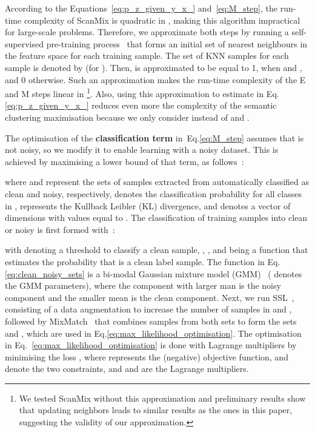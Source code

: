 \documentclass[review]{elsarticle}
\theoremstyle{plain}
\begin{document}
According to the Equations~\ref{eq:p_z_given_y_x_} and~\ref{eq:M_step}, the run-time complexity of ScanMix is quadratic in , making this algorithm impractical for large-scale problems.  Therefore, we approximate both steps by running a self-supervised pre-training process~\citep{SimCLR,MoCo,MoCoV2,SCAN} that forms an initial set of  nearest neighbours in the feature space  for each training sample.  
The set of KNN samples for each sample  is denoted by  (for ).
Then,  is approximated to be equal to 1, when  and , and 0 otherwise. Such an approximation makes the run-time complexity of the E and M steps linear in \footnote{We tested ScanMix without this approximation and preliminary results show that updating neighbors  leads to similar results as the ones in this paper, suggesting the validity of our approximation.}. Also, using this approximation to estimate  in Eq.\ref{eq:p_z_given_y_x_} reduces even more the complexity of the semantic clustering maximisation because we
only consider  instead of  and .





The optimisation of the \textbf{classification term} in~Eq.\ref{eq:M_step} assumes that  is not noisy, so we modify it to enable learning with a noisy dataset.  This is achieved by maximising a lower bound of that term, as follows~\citep{li2020dividemix}:

where  and  represent the
sets of samples extracted from  automatically classified as clean and noisy, respectively,  denotes the classification probability for all classes in ,  represents the Kullback Leibler (KL) divergence, and  denotes a vector of  dimensions with values equal to .  
The classification of training samples into clean or noisy is first formed with~\citep{arazo2019unsupervised, li2020dividemix,rog, jiang2020beyond}:
 
with  denoting a threshold to classify a clean sample, ,
, and  being a function that estimates the probability that  is a clean label sample.  The function  in Eq.\ref{eq:clean_noisy_sets} is a bi-modal Gaussian mixture model (GMM)~\citep{li2020dividemix} ( denotes the GMM parameters), where the component with larger man is the noisy component and the smaller mean is the clean component.
Next, we run SSL~\citep{li2020dividemix}, consisting of a data augmentation to increase the number of samples in  and , followed by 
MixMatch~\citep{MixMatch} 
that combines samples from both sets to form the sets  and , which are used in Eq.\ref{eq:max_likelihood_optimisation}. 
The optimisation in Eq.~\ref{eq:max_likelihood_optimisation} is done with Lagrange multipliers by minimising the loss , where  represents the (negative) objective function,  and  denote the two constraints, and  and  are the Lagrange multipliers.
\end{document}
